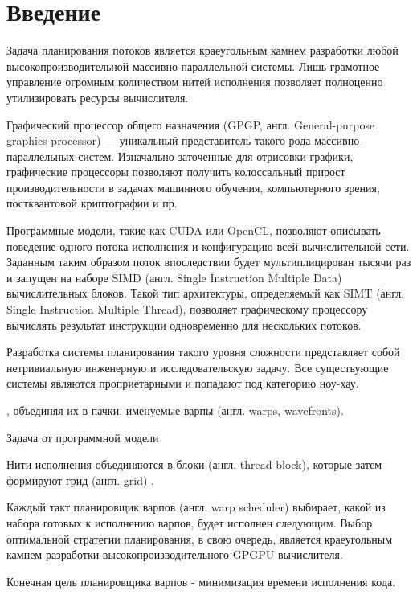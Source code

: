 \section{Введение}

Задача планирования потоков является краеугольным камнем разработки любой высокопроизводительной массивно-параллельной системы. Лишь грамотное управление огромным количеством нитей исполнения позволяет полноценно утилизировать ресурсы вычислителя.  

Графический процессор общего назначения (GPGP, англ. General-purpose graphics processor) --- уникальный представитель такого рода массивно-параллельных систем. Изначально заточенные для отрисовки графики, графические процессоры позволяют получить колоссальный прирост производительности в задачах машинного обучения, компьютерного зрения, постквантовой криптографии и пр.    

Программные модели, такие как CUDA\cite{CUDA_Article} или OpenCL\cite{OpenCL}, позволяют описывать поведение одного потока исполнения и конфигурацию всей вычислительной сети. Заданным таким образом поток впоследствии будет мультиплицирован тысячи раз и запущен на наборе SIMD (англ. Single Instruction Multiple Data) вычислительных блоков. Такой тип архитектуры, определяемый как SIMT (англ. Single Instruction Multiple Thread)\cite{SIMT}, позволяет графическому процессору вычислять результат инструкции одновременно для нескольких потоков. 



Разработка системы планирования такого уровня сложности представляет собой нетривиальную инженерную и исследовательскую задачу. Все существующие системы являются проприетарными и попадают под категорию ноу-хау. 

, объединяя их в пачки, именуемые варпы (англ. warps, wavefronts). 



Задача от программной модели 

Нити исполнения объединяются в блоки (англ. thread block), которые затем формируют грид (англ. grid) \cite{CUDA_C_Programming_Guide}. 



Каждый такт планировщик варпов (англ. warp scheduler) выбирает, какой из набора готовых к исполнению варпов, будет исполнен следующим. Выбор оптимальной стратегии планирования, в свою очередь, является краеугольным камнем разработки высокопроизводительного GPGPU вычислителя.

Конечная цель планировщика варпов - минимизация времени исполнения кода. 

